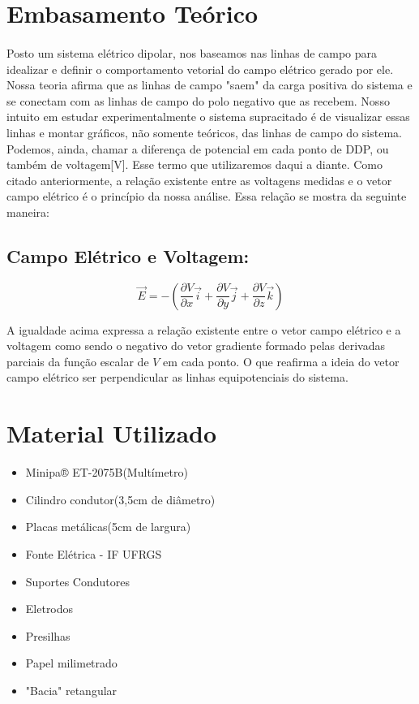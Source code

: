 \documentclass[column,brazilian,12pt,a4paper,final]{article}
\begin{document}
\section{Embasamento Teórico}
\paragraph{}
Posto um sistema elétrico dipolar, nos baseamos nas linhas de campo para idealizar e definir o comportamento vetorial do campo elétrico gerado por ele. Nossa teoria afirma que as linhas de campo "saem" da carga positiva do sistema e se conectam com as linhas de campo do polo negativo que as recebem. Nosso intuito em estudar experimentalmente o sistema supracitado é de visualizar essas linhas e montar gráficos, não somente teóricos, das linhas de campo do sistema. Podemos, ainda, chamar a diferença de potencial em cada ponto de DDP, ou também de voltagem[V]. Esse termo que utilizaremos daqui a diante. Como citado anteriormente, a relação existente entre as voltagens medidas e o vetor campo elétrico é o princípio da nossa análise. Essa relação se mostra da seguinte maneira:

\subsection{Campo Elétrico e Voltagem:}

\begin{equation}
    \Vec{E} = -(\frac{\partial V}{\partial x}\vec{i} + \frac{\partial V}{\partial y}\vec{j} + \frac{\partial V}{\partial z}\vec{k})
\end{equation}

A igualdade acima expressa a relação existente entre o vetor campo elétrico e a voltagem como sendo o negativo do vetor gradiente formado pelas derivadas parciais da função escalar de $V$ em cada ponto. O que reafirma a ideia do vetor campo elétrico ser perpendicular as linhas equipotenciais do sistema. 

\section{Material Utilizado}
\begin{itemize}
    \item Minipa® ET-2075B(Multímetro)
    \item Cilindro condutor(3,5cm de diâmetro)
    \item Placas metálicas(5cm de largura)
    \item Fonte Elétrica - IF UFRGS
    \item Suportes Condutores 
    \item Eletrodos
    \item Presilhas
    \item Papel milimetrado
    \item "Bacia" retangular 

\end{itemize}
\end{document}
